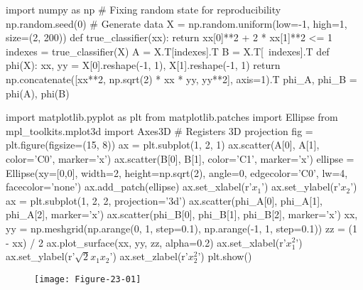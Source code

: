 \begin{python}
import numpy as np
# Fixing random state for reproducibility
np.random.seed(0)
# Generate data
X = np.random.uniform(low=-1, high=1, size=(2, 200))
def true_classifier(xx):
    return xx[0]**2 + 2 * xx[1]**2 <= 1
indexes = true_classifier(X)
A = X.T[indexes].T
B = X.T[~indexes].T
def phi(X):
    xx, yy = X[0].reshape(-1, 1), X[1].reshape(-1, 1)
    return np.concatenate([xx**2, np.sqrt(2) * xx * yy, yy**2], axis=1).T
phi_A, phi_B = phi(A), phi(B)
\end{python}

\begin{python}
import matplotlib.pyplot as plt
from matplotlib.patches import Ellipse
from mpl_toolkits.mplot3d import Axes3D  # Registers 3D projection
fig = plt.figure(figsize=(15, 8))
ax = plt.subplot(1, 2, 1)
ax.scatter(A[0], A[1], color='C0', marker='x')
ax.scatter(B[0], B[1], color='C1', marker='x')
ellipse = Ellipse(xy=[0,0], width=2, height=np.sqrt(2), angle=0,
              edgecolor='C0', lw=4, facecolor='none')
ax.add_patch(ellipse)
ax.set_xlabel(r'$x_{1}$')
ax.set_ylabel(r'$x_{2}$')
ax = plt.subplot(1, 2, 2, projection='3d')
ax.scatter(phi_A[0], phi_A[1], phi_A[2], marker='x')
ax.scatter(phi_B[0], phi_B[1], phi_B[2], marker='x')
xx, yy = np.meshgrid(np.arange(0, 1, step=0.1), np.arange(-1, 1, step=0.1))
zz = (1 - xx) / 2
ax.plot_surface(xx, yy, zz, alpha=0.2)
ax.set_xlabel(r'$x_{1}^{2}$')
ax.set_ylabel(r'$\sqrt{2} x_{1} x_{2}$')
ax.set_zlabel(r'$x_{2}^{2}$')
plt.show()
\end{python}

\begin{figure}[H]
\centering
\texttt{[image: Figure-23-01]}
\end{figure}

